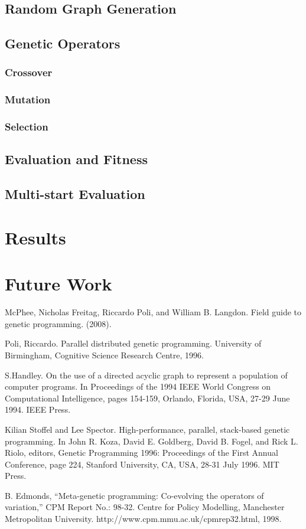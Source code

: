 \documentclass[conference]{IEEEtran}
\begin{document}
	\subsection{Random Graph Generation}
	\subsection{Genetic Operators}
	\subsubsection{Crossover}
	\subsubsection{Mutation}
	\subsubsection{Selection}
	\subsection{Evaluation and Fitness}
	\subsection{Multi-start Evaluation}
	
	\section{Results}
	
	\section{Future Work}
	
	\begin{thebibliography}{00}
				
		 McPhee, Nicholas Freitag, Riccardo Poli, and William B. Langdon. Field
		guide to genetic programming. (2008).
		
		 Poli, Riccardo. Parallel distributed genetic programming. University of Birmingham, Cognitive Science Research Centre, 1996.
		
		 S.Handley. On the use of a directed acyclic graph to represent a population of computer programs. In Proceedings of the 1994 IEEE World Congress on Computational Intelligence, 
		pages 154-159, Orlando, Florida, USA, 27-29 June 1994. IEEE Press.

		 Kilian Stoffel and Lee Spector. High-performance, parallel, stack-based genetic programming. In John R. Koza, David E. Goldberg, David B. Fogel, and Rick L. Riolo, editors, Genetic Programming 1996: Proceedings of the First Annual Conference, page 224, Stanford University, CA, USA, 28-31 July 1996. MIT Press.
			
		 B. Edmonds, “Meta-genetic programming: Co-evolving the operators of variation,” CPM Report No.: 98-32. Centre for Policy Modelling, Manchester Metropolitan University. http://www.cpm.mmu.ac.uk/cpmrep32.html, 1998.
		\end{thebibliography}
	
\end{document}
